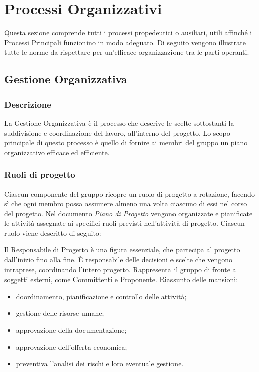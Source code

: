 \section{Processi Organizzativi}
	Questa sezione comprende tutti i processi propedeutici o ausiliari, utili affinché i Processi Principali funzionino in modo adeguato. Di seguito vengono illustrate tutte le norme da rispettare per un'efficace organizzazione tra le parti operanti.

	\subsection{Gestione Organizzativa}
	
		\subsubsection{Descrizione}
			La Gestione Organizzativa è il processo che descrive le scelte sottostanti la suddivisione e coordinazione del lavoro, all'interno del progetto. Lo scopo principale di questo processo è quello di fornire ai membri del gruppo un piano organizzativo efficace ed efficiente.
			
		
		\subsubsection{Ruoli di progetto}
			Ciascun componente del gruppo ricopre un ruolo di progetto a rotazione, facendo sì che ogni membro possa assumere almeno una volta ciascuno di essi nel corso del progetto. Nel documento \textit{Piano di Progetto} vengono organizzate e pianificate le attività assegnate ai specifici ruoli previsti nell'attività di progetto. Ciascun ruolo viene descritto di seguito:
			
			Il Responsabile di Progetto è una figura essenziale, che partecipa al progetto dall'inizio fino alla fine. È responsabile delle decisioni e scelte che vengono intraprese, coordinando l'intero progetto. Rappresenta il gruppo di fronte a soggetti esterni, come Committenti e Proponente.
			Riassunto delle mansioni:
			\begin{itemize}
				\item doordinamento, pianificazione e controllo delle attività;
				\item gestione delle risorse umane;
				\item approvazione della documentazione;
				\item approvazione dell'offerta economica;
				\item preventiva l'analisi dei rischi e loro eventuale gestione.
			\end{itemize}
			
